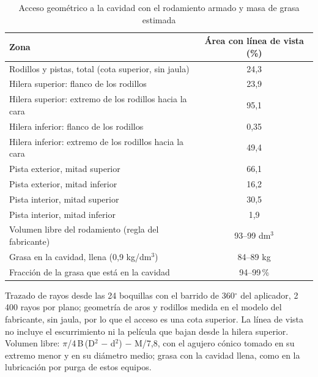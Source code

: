\begin{table}[htbp]
\centering\small\singlespacing
\caption{Acceso geométrico a la cavidad con el rodamiento armado y masa de grasa estimada}
\label{tab:cfd-cavidad}
\begin{tabularx}{\textwidth}{@{}Yc@{}}
\toprule
\textbf{Zona} & \textbf{Área con línea de vista (\%)}\\
\midrule
Rodillos y pistas, total (cota superior, sin jaula) & 24,3\\
Hilera superior: flanco de los rodillos & 23,9\\
Hilera superior: extremo de los rodillos hacia la cara & 95,1\\
Hilera inferior: flanco de los rodillos & 0,35\\
Hilera inferior: extremo de los rodillos hacia la cara & 49,4\\
Pista exterior, mitad superior & 66,1\\
Pista exterior, mitad inferior & 16,2\\
Pista interior, mitad superior & 30,5\\
Pista interior, mitad inferior & 1,9\\
\midrule
Volumen libre del rodamiento (regla del fabricante) & 93--99 dm$^3$\\
Grasa en la cavidad, llena (0,9 kg/dm$^3$) & 84--89 kg\\
Fracción de la grasa que está en la cavidad & 94--99\,\%\\
\bottomrule
\end{tabularx}
\par\smallskip\footnotesize
Trazado de rayos desde las 24 boquillas con el barrido de 360$^\circ$ del aplicador, 2 400 rayos por plano; geometría de aros y rodillos medida en el modelo del fabricante, sin jaula, por lo que el acceso es una cota superior. La línea de vista no incluye el escurrimiento ni la película que bajan desde la hilera superior. Volumen libre: $\pi$/4\,B\,(D$^2$ $-$ d$^2$) $-$ M/7,8, con el agujero cónico tomado en su extremo menor y en su diámetro medio; grasa con la cavidad llena, como en la lubricación por purga de estos equipos.
\end{table}

